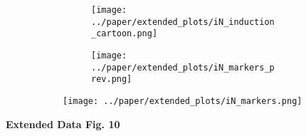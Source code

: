 \begin{figure}[H]
    \begin{subfigure}[t]{\textwidth}
        \begin{subfigure}[t]{0.45\textwidth}
            \caption{}
            \texttt{[image: ../paper/extended\_plots/iN\_induction\_cartoon.png]}        
        \end{subfigure}
        \begin{subfigure}[t]{0.45\textwidth}
            \caption{}
            \texttt{[image: ../paper/extended\_plots/iN\_markers\_prev.png]}        
        \end{subfigure}
    \end{subfigure}
    \begin{subfigure}[t]{0.8\textwidth}
        \caption{}
        \hspace{2cm}
        \texttt{[image: ../paper/extended\_plots/iN\_markers.png]}        
    \end{subfigure}
\end{figure}
\textbf{Extended Data Fig. 10}